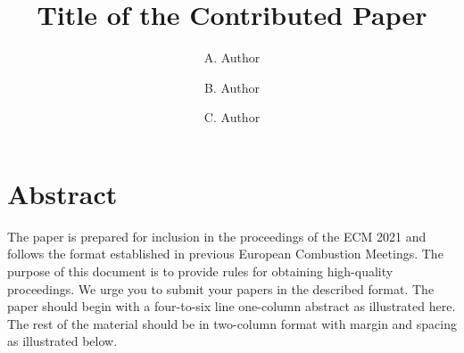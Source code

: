 \documentclass[10pt,a4paper]{ecm}
\title{Title of the Contributed Paper}
\author[1]{A. Author}
\author[2]{B. Author}
\author[3,*]{C. Author}
\affil[1]{A. Author Affiliation}
\affil[2]{B. Author Affiliation}
\affil[3]{C. Author Affiliation}
\begin{document}
\maketitle
\thispagestyle{empty} %


\section*{Abstract} %
\noindent The paper is prepared for inclusion in the proceedings of the ECM 2021 and follows the format established in previous European Combustion Meetings.
The purpose of this document is to provide rules for obtaining high-quality proceedings.
We urge you to submit your papers in the described format.
The paper should begin with a four-to-six line one-column abstract as illustrated here.
The rest of the material should be in two-column format with margin and spacing as illustrated below.
\end{document}
